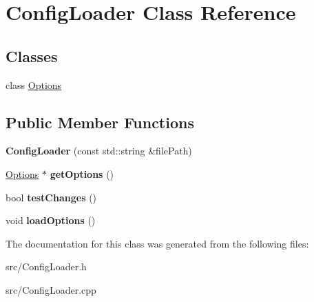 \hypertarget{class_config_loader}{
\section{ConfigLoader Class Reference}
\label{class_config_loader}
}
\subsection*{Classes}
\begin{DoxyCompactItemize}
\item 
class \hyperlink{class_config_loader_1_1_options}{Options}
\end{DoxyCompactItemize}
\subsection*{Public Member Functions}
\begin{DoxyCompactItemize}
\item 
\hypertarget{class_config_loader_a1899198703bc4c8eb5b4fcf190032d60}{
{\bfseries ConfigLoader} (const std::string \&filePath)}
\label{class_config_loader_a1899198703bc4c8eb5b4fcf190032d60}

\item 
\hypertarget{class_config_loader_a9c4a171792434149a40868fbd479ab2b}{
\hyperlink{class_config_loader_1_1_options}{Options} $\ast$ {\bfseries getOptions} ()}
\label{class_config_loader_a9c4a171792434149a40868fbd479ab2b}

\item 
\hypertarget{class_config_loader_a508c93b5ce239aa137a3f8952600dced}{
bool {\bfseries testChanges} ()}
\label{class_config_loader_a508c93b5ce239aa137a3f8952600dced}

\item 
\hypertarget{class_config_loader_a3c36ad1932d9b200d53f790234b7ea4e}{
void {\bfseries loadOptions} ()}
\label{class_config_loader_a3c36ad1932d9b200d53f790234b7ea4e}

\end{DoxyCompactItemize}


The documentation for this class was generated from the following files:\begin{DoxyCompactItemize}
\item 
src/ConfigLoader.h\item 
src/ConfigLoader.cpp\end{DoxyCompactItemize}
